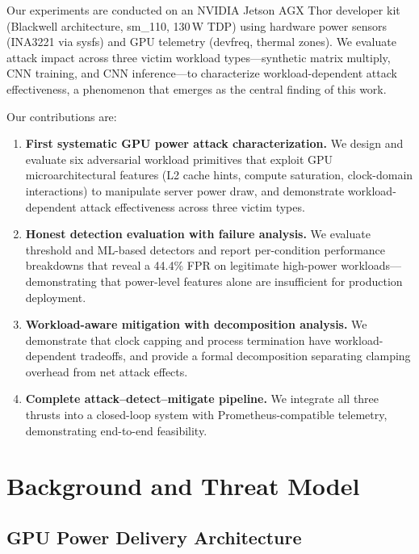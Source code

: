\documentclass[letterpaper,twocolumn,10pt]{article}
\begin{document}
Our experiments are conducted on an NVIDIA Jetson AGX Thor developer
kit (Blackwell architecture, sm\_110, 130\,W TDP) using hardware
power sensors (INA3221 via sysfs) and GPU telemetry (devfreq, thermal
zones).  We evaluate attack impact across three victim workload
types---synthetic matrix multiply, CNN training, and CNN inference---to
characterize workload-dependent attack effectiveness, a phenomenon
that emerges as the central finding of this work.

Our contributions are:

\begin{enumerate}[nosep]
\item \textbf{First systematic GPU power attack characterization.}
  We design and evaluate six adversarial workload primitives that
  exploit GPU microarchitectural features (L2 cache hints, compute
  saturation, clock-domain interactions) to manipulate server power
  draw, and demonstrate workload-dependent attack effectiveness
  across three victim types.

\item \textbf{Honest detection evaluation with failure analysis.}
  We evaluate threshold and ML-based detectors and report per-condition
  performance breakdowns that reveal a 44.4\% FPR on legitimate
  high-power workloads---demonstrating that power-level features
  alone are insufficient for production deployment.

\item \textbf{Workload-aware mitigation with decomposition analysis.}
  We demonstrate that clock capping and process termination have
  workload-dependent tradeoffs, and provide a formal decomposition
  separating clamping overhead from net attack effects.

\item \textbf{Complete attack--detect--mitigate pipeline.}
  We integrate all three thrusts into a closed-loop system with
  Prometheus-compatible telemetry, demonstrating end-to-end feasibility.
\end{enumerate}


\section{Background and Threat Model}
\label{sec:background}

\subsection{GPU Power Delivery Architecture}
\label{sec:bg-power}
\end{document}
